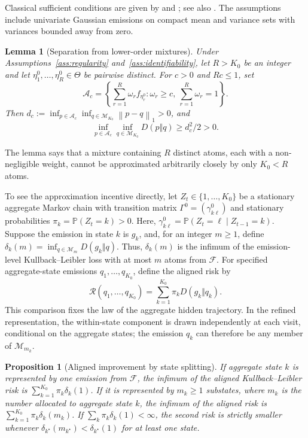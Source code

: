 \documentclass[11pt]{article}
\newtheorem{proposition}[theorem]{Proposition}
\newtheorem{lemma}[theorem]{Lemma}
\theoremstyle{definition}
\newcommand{\Pbb}{\mathbb{P}}
\newcommand{\Fcal}{\mathcal{F}}
\newcommand{\Mcal}{\mathcal{M}}
\newcommand{\Acal}{\mathcal{A}}
\newcommand{\norm}[1]{\left\lVert #1\right\rVert}
\begin{document}
Classical sufficient conditions are given by \citet{Teicher1963} and
\citet{YakowitzSpragins1968}; see also \citet{McLachlanPeel2000}. The
assumptions include univariate Gaussian emissions on compact mean and variance
sets with variances bounded away from zero.

\begin{lemma}[Separation from lower-order mixtures]\label{lem:separation}
Under Assumptions~\ref{ass:regularity} and~\ref{ass:identifiability}, let
$R>K_0$ be an integer and let $\eta_1^0,\ldots,\eta_R^0\in\Theta$ be pairwise distinct.
For $c>0$ and
$Rc\leq1$, set
\begin{equation*}
 \Acal_c=\left\{\sum_{r=1}^R\omega_r f_{\eta_r^0}:
 \omega_r\geq c,\ \sum_{r=1}^R\omega_r=1\right\}.
\end{equation*}
Then $d_c:=\inf_{p\in\Acal_c}\inf_{q\in\Mcal_{K_0}}\norm{p-q}_1>0$, and
\begin{equation*}
 \inf_{p\in\Acal_c}\inf_{q\in\Mcal_{K_0}}D(p\Vert q)
 \geq d_c^2/2>0.
\end{equation*}
\end{lemma}

The lemma says that a mixture containing $R$ distinct atoms, each with a
non-negligible weight, cannot be approximated arbitrarily closely by only
$K_0<R$ atoms.

To see the approximation incentive directly, let $Z_t\in\{1,\ldots,K_0\}$ be
a stationary aggregate Markov chain with transition matrix
$\Gamma^0=(\gamma^0_{k\ell})$ and stationary probabilities
$\pi_k=\Pbb(Z_t=k)>0$. Here,
$\gamma^0_{k\ell}=\Pbb(Z_t=\ell\mid Z_{t-1}=k)$. Suppose the emission in state
$k$ is $g_k$, and, for an integer $m\geq1$, define
$\delta_k(m)=\inf_{q\in\Mcal_m}D(g_k\Vert q)$. Thus,
$\delta_k(m)$ is the infimum of the emission-level Kullback--Leibler loss
with at most $m$ atoms from $\Fcal$. For specified aggregate-state
emissions $q_1,\ldots,q_{K_0}$, define the aligned risk by
\begin{equation*}
 \mathcal{R}(q_1,\ldots,q_{K_0})=\sum_{k=1}^{K_0}\pi_k D(g_k\Vert q_k).
\end{equation*}
This comparison fixes the law of the aggregate hidden trajectory. In the
refined representation, the within-state component is drawn independently
at each visit, conditional on the aggregate states; the emission $q_k$ can
therefore be any member of $\Mcal_{m_k}$.

\begin{proposition}[Aligned improvement by state splitting]\label{prop:aligned}
If aggregate state $k$ is represented by one emission from $\Fcal$, the infimum of the
aligned Kullback--Leibler risk is
$\sum_{k=1}^{K_0}\pi_k\delta_k(1)$. If it is represented by $m_k\geq1$
substates, where $m_k$ is the number allocated to aggregate state $k$, the infimum of the
aligned risk is $\sum_{k=1}^{K_0}\pi_k\delta_k(m_k)$. If $\sum_k\pi_k\delta_k(1)<\infty$, the second risk is
strictly smaller whenever
$\delta_{k^\star}(m_{k^\star})<\delta_{k^\star}(1)$ for at least one state.
\end{proposition}
\end{document}
